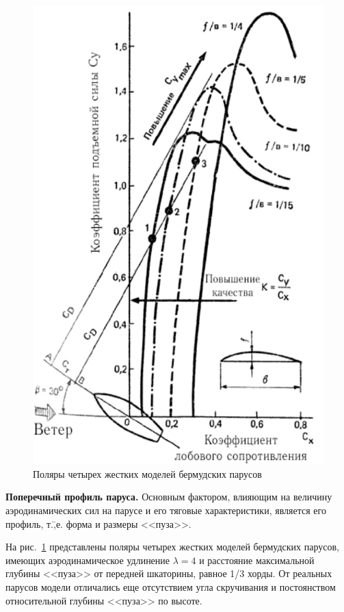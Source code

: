 \documentclass[a4paper, 12pt, twoside, final, book, russian, fittopage, cyremdash]{ncc}
\newcommand{\ris}[1]{\ref{fig:#1}}
\begin{document}
\begin{figure}[htb]
  \centering
  \includegraphics[scale=1]{0026}
  \caption{Поляры четырех жестких моделей бермудских парусов}
  \label{fig:26}
\end{figure}

\textbf{Поперечный профиль паруса.} Основным фактором, влияющим на величину аэродинамических сил на парусе и его тяговые характеристики, является его профиль, т.\=,е. форма и размеры <<пуза>>.

На рис.~\ris{26} представлены поляры четырех жестких моделей бермудских парусов, имеющих аэродинамическое удлинение $\lambda = 4$ и расстояние максимальной глубины <<пуза>> от передней шкаторины, равное 1/3 хорды. От реальных парусов модели отличались еще отсутствием угла скручивания и постоянством относительной глубины <<пуза>> по высоте.
\end{document}
